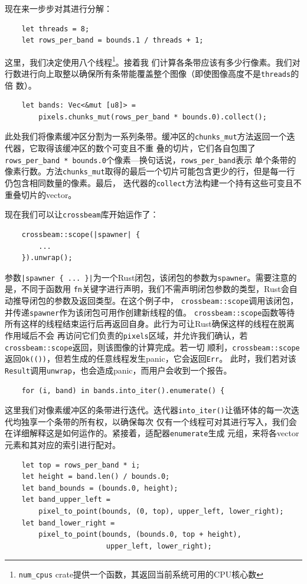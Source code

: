 \smallskip
现在来一步步对其进行分解：
\begin{verbatim}
    let threads = 8;
    let rows_per_band = bounds.1 / threads + 1;
\end{verbatim}

\smallskip
这里，我们决定使用八个线程\footnote{\texttt{num\_cpus} crate提供一个函数，其返回当前系统可用的CPU核心数}。接着我
们计算各条带应该有多少行像素。我们对行数进行向上取整以确保所有条带能覆盖整个图像（即使图像高度不是\texttt{threads}的倍
数）。
\begin{verbatim}
    let bands: Vec<&mut [u8]> = 
        pixels.chunks_mut(rows_per_band * bounds.0).collect();
\end{verbatim}

\smallskip
此处我们将像素缓冲区分割为一系列条带。缓冲区的\texttt{chunks\_mut}方法返回一个迭代器，它取得该缓冲区的数个可变且不重
叠的切片，它们各自包围了\texttt{rows\_per\_band * bounds.0}个像素---换句话说，\texttt{rows\_per\_band}表示
单个条带的像素行数。方法\texttt{chunks\_mut}取得的最后一个切片可能包含更少的行，但是每一行仍包含相同数量的像素。最后，
迭代器的\texttt{collect}方法构建一个持有这些可变且不重叠切片的vector。

\medskip
现在我们可以让\texttt{crossbeam}库开始运作了：
\begin{verbatim}
    crossbeam::scope(|spawner| {
        ...
    }).unwrap();
\end{verbatim}

\medskip
参数\texttt{|spawner \{ ... \}|}为一个Rust闭包，该闭包的参数为\texttt{spawner}。需要注意的是，不同于函数用
\texttt{fn}关键字进行声明，我们不需声明闭包参数的类型，Rust会自动推导闭包的参数及返回类型。在这个例子中，
\texttt{crossbeam::scope}调用该闭包，并传递\texttt{spawner}作为该闭包可用作创建新线程的值。
\texttt{crossbeam::scope}函数等待所有这样的线程结束运行后再返回自身。此行为可让Rust确保这样的线程在脱离作用域后不会
再访问它们负责的\texttt{pixels}区域，并允许我们确认，若\texttt{crossbeam::scope}返回，则该图像的计算完成。若一切
顺利，\texttt{crossbeam::scope}返回\texttt{Ok(())}，但若生成的任意线程发生panic，它会返回\texttt{Err}。
此时，我们若对该\texttt{Result}调用\texttt{unwrap}，也会造成panic，而用户会收到一个报告。
\begin{verbatim}
    for (i, band) in bands.into_iter().enumerate() {
\end{verbatim}

\smallskip
这里我们对像素缓冲区的条带进行迭代。迭代器\texttt{into\_iter()}让循环体的每一次迭代均独享一个条带的所有权，以确保每次
仅有一个线程可对其进行写入，我们会在详细解释这是如何运作的。紧接着，适配器\texttt{enumerate}生成
元组，来将各vector元素和其对应的索引进行配对。
\begin{verbatim}
    let top = rows_per_band * i;
    let height = band.len() / bounds.0;
    let band_bounds = (bounds.0, height);
    let band_upper_left = 
        pixel_to_point(bounds, (0, top), upper_left, lower_right);
    let band_lower_right = 
        pixel_to_point(bounds, (bounds.0, top + height),
                        upper_left, lower_right);
\end{verbatim}

